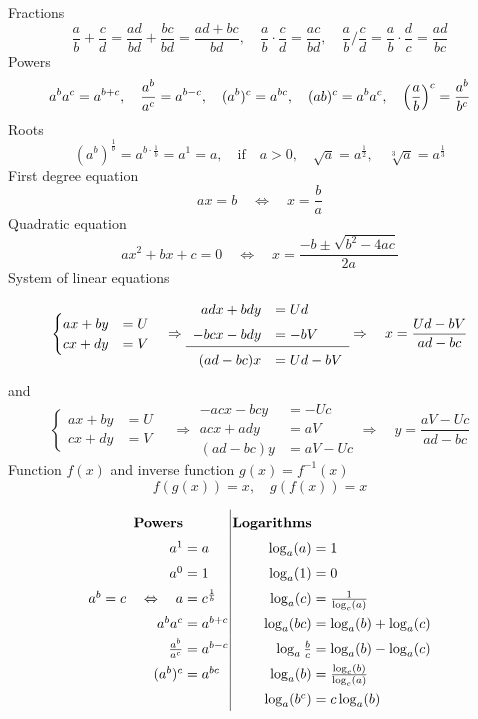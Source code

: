 \documentclass[12pt]{article}
\begin{document}
Fractions
$$
\frac{a}{b}+\frac{c}{d}=\frac{ad}{bd}+\frac{bc}{bd}
=\frac{ad+bc}{bd},\quad 
\frac{a}{b}\cdot\frac{c}{d}=\frac{ac}{bd},\quad
\frac{a}{b}\bigg/\frac{c}{d}=\frac{a}{b}\cdot\frac{d}{c}=\frac{ad}{bc}
$$
Powers
$$
a^ba^c=a^{b+c},\quad 
\frac{a^b}{a^c}=a^{b-c},\quad 
(a^b)^c=a^{bc},\quad 
(ab)^c=a^ba^c,\quad 
\left(\frac{a}{b}\right)^c=\frac{a^b}{b^c}
$$
Roots
$$
(a^b)^{\frac{1}{b}}=a^{b\cdot \frac{1}{b}}=a^1=a,\quad\textrm{if}\quad a>0,\quad 
\sqrt{a}=a^{\frac{1}{2}},\quad \sqrt[3]{a}=a^{\frac{1}{3}}
$$
First degree equation
$$
ax=b\quad\Leftrightarrow\quad x=\frac{b}{a}
$$
Quadratic equation
$$
ax^2+bx+c=0\quad\Leftrightarrow\quad x=\frac{-b\pm\sqrt{b^2-4ac}}{2a}
$$
System of linear equations
$$
\begin{cases}
ax+by&=U\\
cx+dy&=V
\end{cases}\quad\Rightarrow
\begin{array}{rl}
adx+bdy&=Ud\\
-bcx-bdy&=-bV\\
\hline
(ad-bc)x&=Ud-bV
\end{array}\Rightarrow\quad x=\frac{Ud-bV}{ad-bc}\\
$$
and
$$
\begin{cases}
ax+by&=U\\
cx+dy&=V
\end{cases}\quad\Rightarrow
\begin{array}{rl}
-acx-bcy&=-Uc\\
acx+ady&=aV\\
\hline
(ad-bc)y&=aV-Uc
\end{array}\Rightarrow\quad  y=\frac{aV-Uc}{ad-bc}
$$
Function $f(x)$ and inverse function $g(x)=f^{-1}(x)$
$$
f(g(x))=x,\quad
g(f(x))=x
$$

$$\arraycolsep=1.4pt\def\arraystretch{1.5}
\begin{array}{rl|rl}
\textbf{Powers} && \textbf{Logarithms}\\
a^1 &=a & \log_a(a)&=1\\
a^0 &=1 & \log_a(1)&=0\\
a^b=c\quad\Leftrightarrow\quad a&=c^{\frac{1}{b}} & \log_a(c) &=\frac{1}{\log_c(a)}\\
a^ba^c &= a^{b+c} & \log_a(bc)&=\log_a(b)+\log_a(c)\\
\frac{a^b}{a^c}&=a^{b-c} & \log_a\frac{b}{c}&=\log_a(b)-\log_a(c)\\
(a^b)^c&=a^{bc} & \log_a(b)&=\frac{\log_c(b)}{\log_c(a)}\\
&& \log_a(b^c)&=c\log_a(b)\\
\end{array}
$$
\end{document}
